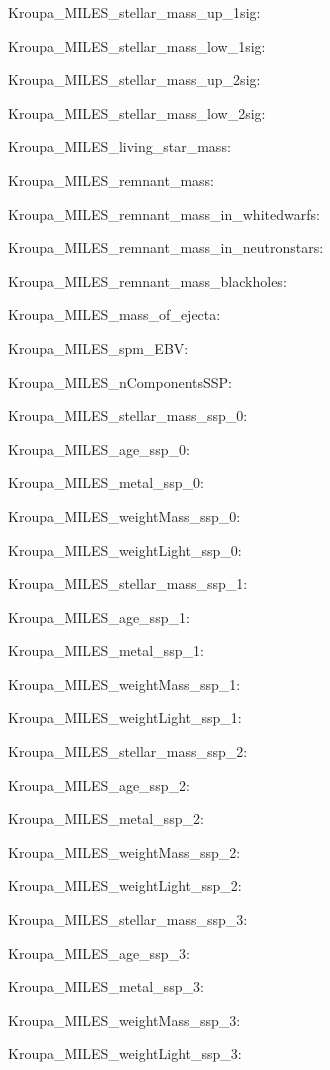 \item Kroupa\_MILES\_stellar\_mass\_up\_1sig: 
\item Kroupa\_MILES\_stellar\_mass\_low\_1sig: 
\item Kroupa\_MILES\_stellar\_mass\_up\_2sig: 
\item Kroupa\_MILES\_stellar\_mass\_low\_2sig: 
\item Kroupa\_MILES\_living\_star\_mass: 
\item Kroupa\_MILES\_remnant\_mass: 
\item Kroupa\_MILES\_remnant\_mass\_in\_whitedwarfs: 
\item Kroupa\_MILES\_remnant\_mass\_in\_neutronstars: 
\item Kroupa\_MILES\_remnant\_mass\_blackholes: 
\item Kroupa\_MILES\_mass\_of\_ejecta: 
\item Kroupa\_MILES\_spm\_EBV: 
\item Kroupa\_MILES\_nComponentsSSP: 
\item Kroupa\_MILES\_stellar\_mass\_ssp\_0: 
\item Kroupa\_MILES\_age\_ssp\_0: 
\item Kroupa\_MILES\_metal\_ssp\_0: 
\item Kroupa\_MILES\_weightMass\_ssp\_0: 
\item Kroupa\_MILES\_weightLight\_ssp\_0: 
\item Kroupa\_MILES\_stellar\_mass\_ssp\_1: 
\item Kroupa\_MILES\_age\_ssp\_1: 
\item Kroupa\_MILES\_metal\_ssp\_1: 
\item Kroupa\_MILES\_weightMass\_ssp\_1: 
\item Kroupa\_MILES\_weightLight\_ssp\_1: 
\item Kroupa\_MILES\_stellar\_mass\_ssp\_2: 
\item Kroupa\_MILES\_age\_ssp\_2: 
\item Kroupa\_MILES\_metal\_ssp\_2: 
\item Kroupa\_MILES\_weightMass\_ssp\_2: 
\item Kroupa\_MILES\_weightLight\_ssp\_2: 
\item Kroupa\_MILES\_stellar\_mass\_ssp\_3: 
\item Kroupa\_MILES\_age\_ssp\_3: 
\item Kroupa\_MILES\_metal\_ssp\_3: 
\item Kroupa\_MILES\_weightMass\_ssp\_3: 
\item Kroupa\_MILES\_weightLight\_ssp\_3: 
